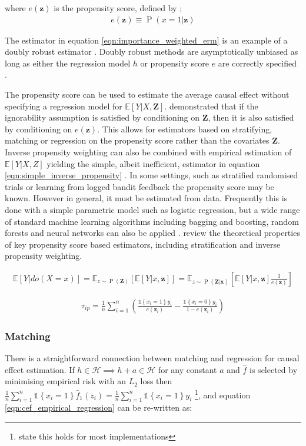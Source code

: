 \documentclass[11pt,a4paper,oneside]{book}
\newcommand{\vb}[1]{\boldsymbol{#1}}
\newcommand{\Esub}[2]{\mathbb E_{#1}\left[{#2}\right]}
\newcommand{\E}[1]{\mathbb E\left[{#1}\right]}
\newcommand{\set}[1]{\left\{#1\right\}}
\newcommand{\ind}[1]{\mathds{1}\!\!\set{#1}}
\newcommand{\eqn}[1]{\begin{align}#1\end{align}}
\renewcommand{\P}[1]{\operatorname{P}\left(#1\right)}
\theoremstyle{plain}
\theoremstyle{definition}
\begin{document}
where $e(\vb{z})$ is the propensity score, defined by \citep{Rosenbaum1983};
\eqn{
e(\vb{z})\equiv \P{x=1|\vb{z}}
}

The estimator in equation \ref{eqn:importance_weighted_erm} is an example of a doubly robust estimator \citep{scharfstein1999adjusting,}. Doubly robust methods are asymptotically unbiased as long as either the regression model $h$ or propensity score $e$ are correctly specified \citep{robins1995semiparametric}. 

The propensity score can be used to estimate the average causal effect without specifying a regression model for $\E{Y|X,\vb{Z}}$. \citet{Rosenbaum1983} demonstrated that if the ignorability assumption is satisfied by conditioning on $\vb{Z}$, then it is also satisfied by conditioning on $e(\vb{z})$. This allows for estimators based on stratifying, matching or regression on the propensity score rather than the covariates $\vb{Z}$. Inverse propensity weighting can also be combined with empirical estimation of $\E{Y|X,Z}$ yielding the simple, albeit inefficient, estimator in equation \ref{eqn:simple_inverse_propensity} \citep{Imbens2004}. In some settings, such as stratified randomised trials \citep{imbens2015causal} or learning from logged bandit feedback \citep{Bottou2013} the propensity score may be known. However in general, it must be estimated from data. Frequently this is done with a simple parametric model such as logistic regression, but a wide range of standard machine learning algorithms including bagging and boosting, random forests and neural networks can also be applied   \citep{Austin2011}. \citet{Lunceford2004} review the theoretical properties of key propensity score based estimators, including stratification and inverse propensity weighting. 

\eqn{
\E{Y|do(X=x)} = \Esub{z\sim \P{\vb{Z}}}{\E{Y|x,\vb{z}}} = \Esub{z\sim \P{\vb{Z|x}}}{\E{Y|x,\vb{z}}\frac{1}{e(\vb{z})}}
}

\eqn{
\label{eqn:simple_inverse_propensity}
\hat{\tau}_{ip} = \frac{1}{n}\sum_{i=1}^n \left(\frac{\ind{x_i=1}y_i}{e(\vb{z}_i)} -\frac{\ind{x_i=0}y_i}{1-e(\vb{z}_i)}\right)
}


\subsubsection{Matching}
There is a straightforward connection between matching and regression for causal effect estimation. If $h \in \mathcal{H} \implies h + a \in \mathcal{H}$ for any constant $a$ and $\hat{f}$ is selected by minimising empirical risk with an $L_2$ loss then $\frac{1}{n}\sum_{i=1}^n \ind{x_i=1}\hat{f}_1(z_i) = \frac{1}{n}\sum_{i=1}^n \ind{x_i=1}y_i$ \footnote{\citep{Imbens2004} state this holds for most implementations}, and equation \ref{eqn:cef_empirical_regression} can be re-written as: 
\end{document}
